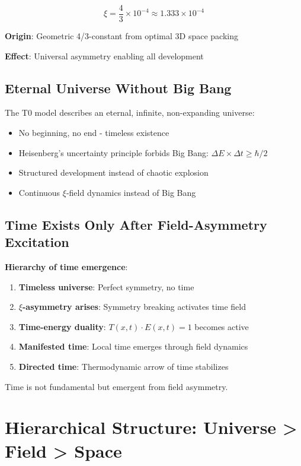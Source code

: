 \documentclass[12pt,a4paper]{article}
\newcommand{\xipar}{\xi}
\theoremstyle{definition}
\theoremstyle{remark}
\begin{document}
	\begin{equation}
		\xipar = \frac{4}{3} \times 10^{-4} \approx 1.333 \times 10^{-4}
	\end{equation}
	
	\textbf{Origin}: Geometric 4/3-constant from optimal 3D space packing
	
	\textbf{Effect}: Universal asymmetry enabling all development
	
	\subsection{Eternal Universe Without Big Bang}
	
	The T0 model describes an eternal, infinite, non-expanding universe:
	
	\begin{itemize}
		\item No beginning, no end - timeless existence
		\item Heisenberg's uncertainty principle forbids Big Bang: $\Delta E \times \Delta t \geq \hbar/2$
		\item Structured development instead of chaotic explosion
		\item Continuous $\xipar$-field dynamics instead of Big Bang
	\end{itemize}
	
	\subsection{Time Exists Only After Field-Asymmetry Excitation}
	
	\textbf{Hierarchy of time emergence}:
	\begin{enumerate}
		\item \textbf{Timeless universe}: Perfect symmetry, no time
		\item \textbf{$\xipar$-asymmetry arises}: Symmetry breaking activates time field
		\item \textbf{Time-energy duality}: $T(x,t) \cdot E(x,t) = 1$ becomes active
		\item \textbf{Manifested time}: Local time emerges through field dynamics
		\item \textbf{Directed time}: Thermodynamic arrow of time stabilizes
	\end{enumerate}
	
	Time is not fundamental but emergent from field asymmetry.
	
	\section{Hierarchical Structure: Universe > Field > Space}
	
\end{document}
